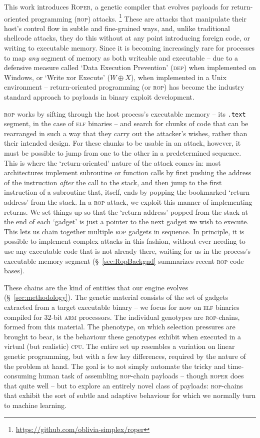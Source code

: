 This work introduces \textsc{Roper}, a genetic compiler that evolves payloads for
return-oriented programming (\textsc{rop}) attacks.%
\footnote{\url{https://github.com/oblivia-simplex/roper}}
These are
attacks that manipulate their host's control flow in subtle and
fine-grained ways, and, unlike traditional shellcode attacks,
they do this without at any point introducing foreign code,
or writing to executable memory. Since it is becoming
increasingly rare for processes to map \emph{any} segment of
memory as both writeable and executable -- due to a defensive
measure called `Data Execution Prevention' (\textsc{dep}) when
implemented on Windows, or `Write xor Execute'
($W \oplus X$), when implemented in a Unix environment --
return-oriented programming (or \textsc{rop}) has become the
industry standard approach to payloads in binary exploit
development. 

\textsc{rop} works by sifting through the host process's executable memory
-- its \texttt{.text} segment, in the case of \textsc{elf} binaries -- and search for chunks of code that can be
rearranged in such a way that they carry out the attacker's
wishes, rather than their intended design. For these chunks to be
usable in an attack, however, it must be possible to jump from
one to the other in a predetermined sequence. This is where the
`return-oriented' nature of the attack comes in: most
architectures implement subroutine or function calls by first
pushing the address of the instruction \emph{after} the call to
the stack, and then jump to the first instruction of a
subroutine that, itself, ends by popping the bookmarked `return
address' from the stack. In a \textsc{rop} attack, we exploit
this manner of implementing returns. We set things up so that
the `return address' popped from the stack at the end of each
`gadget' is just a pointer to the next gadget we wish to execute.
This lets us chain together multiple \textsc{rop}
gadgets in sequence. In principle, it is possible to
implement complex attacks in this fashion, without ever needing
to use any executable code that is not already there, waiting for
us in the process's executable memory segment (\S~\ref{sec:RopBackgnd} summarizes recent \textsc{rop} code bases).

These chains are the kind of entities that our engine evolves
(\S~\ref{sec:methodology}). The genetic material consists of
the set of gadgets extracted from a target executable binary --
we focus for now on \textsc{elf} binaries compiled for 32-bit
\textsc{arm} processors. The individual genotypes are
\textsc{rop}-chains, formed from this material. The phenotype, on
which selection pressures are brought to bear, is the behaviour
these genotypes exhibit when executed in a virtual (but
realistic) \textsc{cpu}. The entire set up resembles a variation
on linear genetic programming, but with a few key differences,
required by the nature of the problem at hand. The goal is to not
simply automate the tricky and time-consuming human task
of assembling \textsc{rop}-chain payloads -- though
\textsc{roper} does that quite well -- but to explore an entirely
novel class of payloads: \textsc{rop}-chains that exhibit the
sort of subtle and adaptive behaviour for which we normally turn
to machine learning. 

